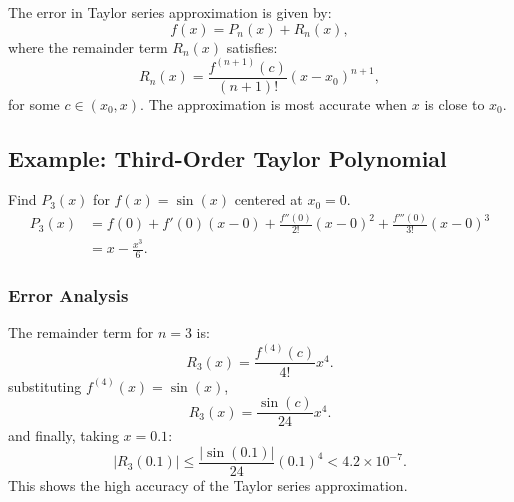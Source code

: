 The error in Taylor series approximation is given by:
\begin{equation*}
    f(x) = P_n(x) + R_n(x),
\end{equation*}
where the remainder term $R_n(x)$ satisfies:
\begin{equation*}
    R_n(x) = \frac{f^{(n+1)}(c)}{(n+1)!} (x - x_0)^{n+1},
\end{equation*}
for some $c \in (x_0, x)$. The approximation is most accurate when $x$ is 
close to $x_0$.

\subsection{Example: Third-Order Taylor Polynomial}

Find $P_3(x)$ for $f(x) = \sin(x)$ centered at $x_0 = 0$.
\begin{align*}
    P_3(x) &= f(0) + f'(0)(x - 0) + \frac{f''(0)}{2!} (x - 0)^2 + 
             \frac{f'''(0)}{3!} (x - 0)^3 \\
           &= x - \frac{x^3}{6}.
\end{align*}

\subsubsection{Error Analysis}
The remainder term for $n = 3$ is:
\begin{equation*}
    R_3(x) = \frac{f^{(4)}(c)}{4!} x^4.
\end{equation*}
substituting $f^{(4)}(x) = \sin(x)$,
\begin{equation*}
    R_3(x) = \frac{\sin(c)}{24} x^4.
\end{equation*}
and finally, taking $x = 0.1$:
\begin{equation*}
    |R_3(0.1)| \leq \frac{|\sin(0.1)|}{24} (0.1)^4 < 4.2 \times 10^{-7}.
\end{equation*}
This shows the high accuracy of the Taylor series approximation.

